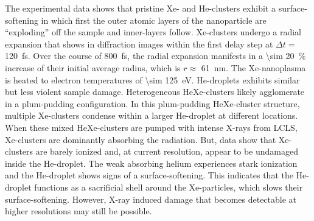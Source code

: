 %
The experimental data shows that pristine Xe- and He-clusters exhibit a surface-softening in which first the outer atomic layers of the nanoparticle are ``exploding'' off the sample and inner-layers follow. Xe-clusters undergo a radial expansion that shows in diffraction images within the first delay step at $\Delta t =$ \SI{120}{\femto\second}. Over the course of \SI{800}{\femto\second}, the radial expansion manifests in a \SI{\sim 20}{\percent} increase of their initial average radius, which is $r\approx$ \SI{61}{\nano\meter}. The Xe-nanoplasma is heated to electron temperatures of \SI{\sim 125}{\electronvolt}. He-droplets exhibits similar but less violent sample damage. Heterogeneous HeXe-clusters likely agglomerate in a plum-pudding configuration. In this plum-pudding HeXe-cluster structure, multiple Xe-clusters condense within a larger He-droplet at different locations. When these mixed HeXe-clusters are pumped with intense X-rays from LCLS, Xe-clusters are dominantly absorbing the radiation. But, data show that Xe-clusters are barely ionized and, at current resolution, appear to be undamaged inside the He-droplet. The weak absorbing helium experiences stark ionization and the He-droplet shows signs of a surface-softening. This indicates that the He-droplet functions as a sacrificial shell around the Xe-particles, which slows their surface-softening. However, X-ray induced damage that becomes detectable at higher resolutions may still be possible.\\[0.5\baselineskip]
